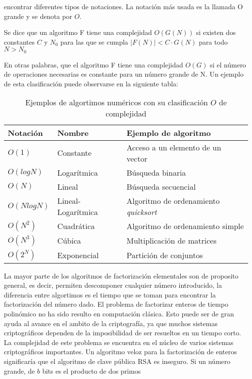 encontrar diferentes tipos de notaciones. La notación más usada es la llamada O grande y se denota por $O$.
\begin{defi}
Se dice que un algoritmo F tiene una complejidad $O(G(N))$ si existen dos constantes $C$ y $N_0$ para las que se cumpla $|F(N)|<C\cdot G(N)$ para todo
$N>N_0$
\end{defi}
En otras palabras, que el algoritmo F tiene una complejidad $O(G)$ si el número de operaciones necesarias es constante para un número grande de N. Un ejemplo
de esta clasificación puede observarse en la siguiente tabla:
\begin{table}[H]
    \centering
    \begin{tabular}{lll}
        \hline
        Notación & Nombre & Ejemplo de algoritmo \\
        \hline
        $O(1)$ & Constante & Acceso a un elemento de un vector\\ 
        $O(log N)$ & Logarítmica& Búsqueda binaria\\
        $O(N)$ & Lineal & Búsqueda secuencial\\
        $O(N log N)$ & Lineal-Logarítmica& Algoritmo de ordenamiento \textit{quicksort}\\
        $O(N^2)$ &Cuadrática & Algoritmo de ordenamiento simple\\
        $O(N^3)$ &Cúbica & Multiplicación de matrices\\
        $O(2^N)$ &Exponencial & Partición de conjuntos\\ \hline
    \end{tabular}
    \caption{Ejemplos de algortimos numéricos con su clasificación $O$ de complejidad}
    \label{tabla:notacion-O}
\end{table}
La mayor parte de los algoritmos de factorización elementales son de proposito general, es decir, permiten descomponer cualquier
número introducido, la diferencia entre algortimos es el tiempo que se toman para encontrar la factorización del número dado. El problema de 
factorizar enteros de tiempo polinómico no ha sido resulto en computación clásica. Esto puede ser de gran ayuda al avance en el ambito de la 
criptografía, ya que muchos sistemas criptográficos dependen de la imposibilidad de ser resueltos en un tiempo corto.\\
La complejidad de este problema se encuentra en el núcleo de varios sistemas criptográficos importantes. Un algoritmo veloz para la factorización
de enteros significaría que el algoritmo de clave pública RSA es inseguro. Si un número grande, de $b$ bits es el producto de dos primos
